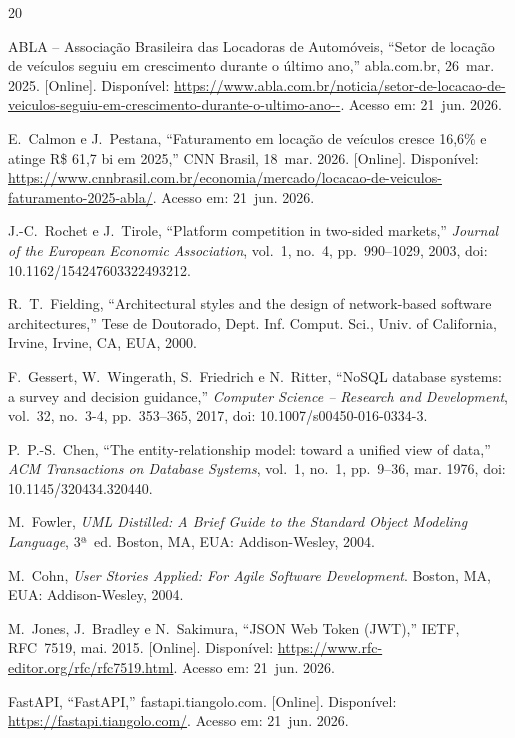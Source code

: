 \documentclass[conference,a4paper]{IEEEtran}
\begin{document}
\begin{thebibliography}{20}

ABLA -- Associação Brasileira das Locadoras de Automóveis, ``Setor de locação de veículos seguiu em crescimento durante o último ano,'' abla.com.br, 26~mar. 2025. [Online]. Disponível: \url{https://www.abla.com.br/noticia/setor-de-locacao-de-veiculos-seguiu-em-crescimento-durante-o-ultimo-ano--}. Acesso em: 21~jun. 2026.

E.~Calmon e J.~Pestana, ``Faturamento em locação de veículos cresce 16,6\% e atinge R\$ 61,7 bi em 2025,'' CNN Brasil, 18~mar. 2026. [Online]. Disponível: \url{https://www.cnnbrasil.com.br/economia/mercado/locacao-de-veiculos-faturamento-2025-abla/}. Acesso em: 21~jun. 2026.

J.-C.~Rochet e J.~Tirole, ``Platform competition in two-sided markets,'' \textit{Journal of the European Economic Association}, vol.~1, no.~4, pp.~990--1029, 2003, doi: 10.1162/154247603322493212.

R.~T.~Fielding, ``Architectural styles and the design of network-based software architectures,'' Tese de Doutorado, Dept. Inf. Comput. Sci., Univ. of California, Irvine, Irvine, CA, EUA, 2000.

F.~Gessert, W.~Wingerath, S.~Friedrich e N.~Ritter, ``NoSQL database systems: a survey and decision guidance,'' \textit{Computer Science -- Research and Development}, vol.~32, no.~3-4, pp.~353--365, 2017, doi: 10.1007/s00450-016-0334-3.

P.~P.-S.~Chen, ``The entity-relationship model: toward a unified view of data,'' \textit{ACM Transactions on Database Systems}, vol.~1, no.~1, pp.~9--36, mar. 1976, doi: 10.1145/320434.320440.

M.~Fowler, \textit{UML Distilled: A Brief Guide to the Standard Object Modeling Language}, 3ª~ed. Boston, MA, EUA: Addison-Wesley, 2004.

M.~Cohn, \textit{User Stories Applied: For Agile Software Development}. Boston, MA, EUA: Addison-Wesley, 2004.

M.~Jones, J.~Bradley e N.~Sakimura, ``JSON Web Token (JWT),'' IETF, RFC~7519, mai. 2015. [Online]. Disponível: \url{https://www.rfc-editor.org/rfc/rfc7519.html}. Acesso em: 21~jun. 2026.

FastAPI, ``FastAPI,'' fastapi.tiangolo.com. [Online]. Disponível: \url{https://fastapi.tiangolo.com/}. Acesso em: 21~jun. 2026.


\end{thebibliography}
\end{document}
